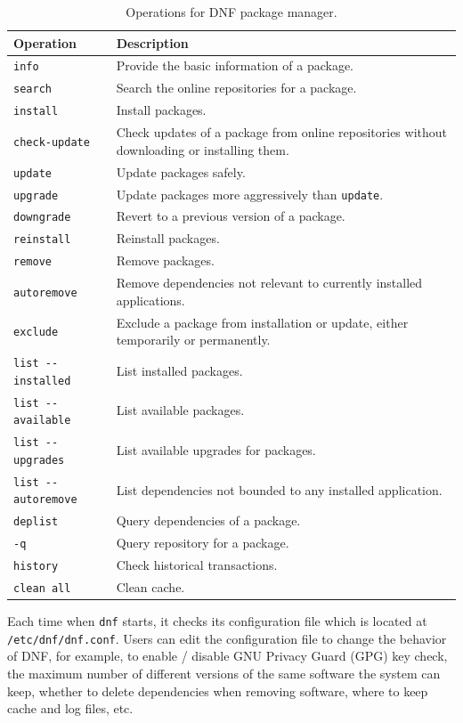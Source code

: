 \begin{table}[!htb]
	\centering \caption{Operations for DNF package manager.}\label{tab:dnf-operations}
	\begin{tabularx}{\textwidth}{lX}
		\hline
		Operation & Description \\ \hline
		\verb|info| & Provide the basic information of a package. \\
		\verb|search| & Search the online repositories for a package. \\
		\verb|install| & Install packages. \\ 
		\verb|check-update| & Check updates of a package from online repositories without downloading or installing them. \\
		\verb|update| & Update packages safely. \\
		\verb|upgrade| & Update packages more aggressively than \verb|update|. \\ 
		\verb|downgrade| & Revert to a previous version of a package. \\
		\verb|reinstall| & Reinstall packages. \\
		\verb|remove| & Remove packages. \\
		\verb|autoremove| & Remove dependencies not relevant to currently installed applications. \\
		\verb|exclude| & Exclude a package from installation or update, either temporarily or permanently. \\
		\verb|list --installed| & List installed packages. \\
		\verb|list --available| & List available packages. \\
		\verb|list --upgrades| & List available upgrades for packages. \\
		\verb|list --autoremove| & List dependencies not bounded to any installed application. \\
		\verb|deplist| & Query dependencies of a package. \\
		\verb|-q| & Query repository for a package. \\
		\verb|history| & Check historical transactions. \\
		\verb|clean all| & Clean cache. \\
		\hline
	\end{tabularx}
\end{table}

Each time when \verb|dnf| starts, it checks its configuration file which is located at \verb|/etc/dnf/dnf.conf|. Users can edit the configuration file to change the behavior of DNF, for example, to enable / disable GNU Privacy Guard (GPG) key check, the maximum number of different versions of the same software the system can keep, whether to delete dependencies when removing software, where to keep cache and log files, etc.


